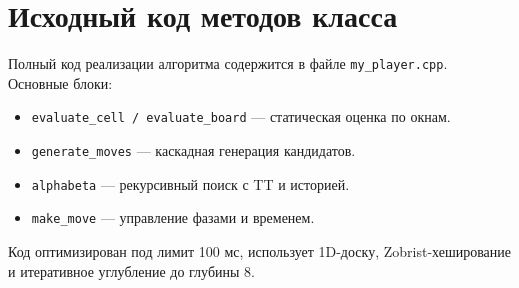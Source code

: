 \documentclass[a4paper,14pt]{extreport}
\begin{document}
\chapter{Исходный код методов класса}
Полный код реализации алгоритма содержится в файле \texttt{my\_player.cpp}. Основные блоки:
\begin{itemize}
    \item \texttt{evaluate\_cell / evaluate\_board} — статическая оценка по окнам.
    \item \texttt{generate\_moves} — каскадная генерация кандидатов.
    \item \texttt{alphabeta} — рекурсивный поиск с TT и историей.
    \item \texttt{make\_move} — управление фазами и временем.
\end{itemize}
Код оптимизирован под лимит 100 мс, использует 1D-доску, Zobrist-хеширование и итеративное углубление до глубины 8.
\end{document}
